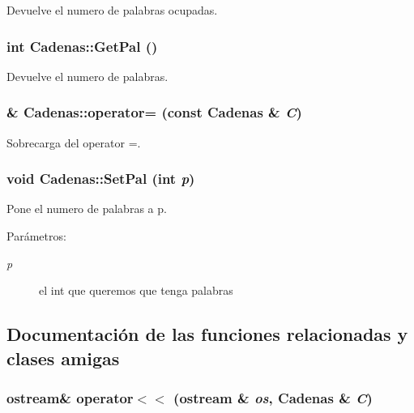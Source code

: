 Devuelve el numero de palabras ocupadas. 

\hypertarget{class_cadenas_4b56f36de7ebc136bcab0d5e988e46ee}{
\subsubsection[{GetPal}]{\setlength{\rightskip}{0pt plus 5cm}int Cadenas::GetPal ()}}
\label{class_cadenas_4b56f36de7ebc136bcab0d5e988e46ee}


Devuelve el numero de palabras. 

\hypertarget{class_cadenas_bb1fcc2b356de5fc9bb8d15c7162741c}{
\subsubsection[{operator=}]{ \& Cadenas::operator= (const {\bf Cadenas} \& {\em C})}}
\label{class_cadenas_bb1fcc2b356de5fc9bb8d15c7162741c}


Sobrecarga del operator =. 

\hypertarget{class_cadenas_5d74cf072d9fbdbfe35d1b137f9fec23}{
\subsubsection[{SetPal}]{\setlength{\rightskip}{0pt plus 5cm}void Cadenas::SetPal (int {\em p})}}
\label{class_cadenas_5d74cf072d9fbdbfe35d1b137f9fec23}


Pone el numero de palabras a p. 

\begin{Desc}
\item[Parámetros:]
\begin{description}
\item[{\em p}]el int que queremos que tenga palabras \end{description}
\end{Desc}


\subsection{Documentación de las funciones relacionadas y clases amigas}
\hypertarget{class_cadenas_fb9ae08a4a831b348a5577c76e0b4a98}{
\subsubsection[{operator$<$$<$}]{\setlength{\rightskip}{0pt plus 5cm}ostream\& operator$<$$<$ (ostream \& {\em os}, \/  {\bf Cadenas} \& {\em C})}}
\label{class_cadenas_fb9ae08a4a831b348a5577c76e0b4a98}


